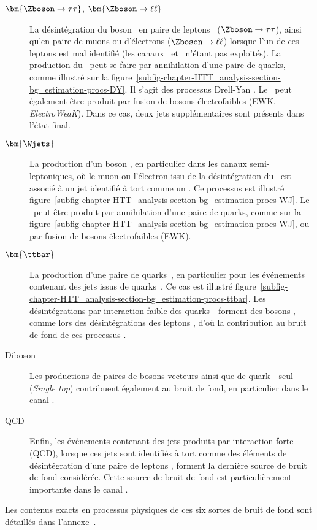 \begin{description}
\item[$\bm{\Zboson\to\tau\tau}$, $\bm{\Zboson\to\ell\ell}$] La désintégration du boson \Zboson\ en paire de leptons \tau\ ($\Zboson\to\tau\tau$),
ainsi qu'en paire de muons ou d'électrons ($\Zboson\to\ell\ell$) lorsque l'un de ces leptons est mal identifié (les canaux \mu\mu\ et \ele\ele\ n'étant pas exploités).
La production du \Zboson\ peut se faire par annihilation d'une paire de quarks, comme illustré sur la figure~\ref{subfig-chapter-HTT_analysis-section-bg_estimation-procs-DY}.
Il s'agit des processus \og Drell-Yan \fg.
Le \Zboson\ peut également être produit par fusion de bosons électrofaibles (EWK, \emph{ElectroWeaK}).
Dans ce cas, deux jets supplémentaires sont présents dans l'état final.
\item[$\bm{\Wjets}$] La production d'un boson \Wboson, en particulier dans les canaux semi-leptoniques, où le muon ou l'électron issu de la désintégration du \Wboson\ est associé à un jet identifié à tort comme un \tauh.
Ce processus est illustré figure~\ref{subfig-chapter-HTT_analysis-section-bg_estimation-procs-WJ}.
Le \Wboson\ peut être produit par annihilation d'une paire de quarks, comme sur la figure~\ref{subfig-chapter-HTT_analysis-section-bg_estimation-procs-WJ}, ou par fusion de bosons électrofaibles (EWK).
\item[$\bm{\ttbar}$] La production d'une paire de quarks~\quarkt, en particulier pour les événements contenant des jets issus de quarks~\quarkb.
Ce cas est illustré figure~\ref{subfig-chapter-HTT_analysis-section-bg_estimation-procs-ttbar}.
Les désintégrations par interaction faible des quarks~\quarkt\ forment des bosons \Wboson, comme lors des désintégrations des leptons \tau, d'où la contribution au bruit de fond de ces processus \ttbar.
\item[Diboson] Les productions de paires de bosons vecteurs ainsi que de quark~\quarkt\ seul (\emph{Single top}) contribuent également au bruit de fond, en particulier dans le canal \ele\mu.
\item[QCD] Enfin, les événements contenant des jets produits par interaction forte (QCD), lorsque ces jets sont identifiés à tort comme des éléments de désintégration d'une paire de leptons \tau, forment la dernière source de bruit de fond considérée.
Cette source de bruit de fond est particulièrement importante dans le canal \tauh\tauh.
\end{description}
Les contenus exacts en processus physiques de ces six sortes de bruit de fond sont détaillés dans l'annexe~.
